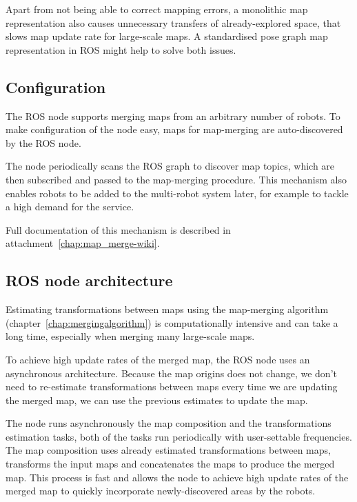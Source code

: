 Apart from not being able to correct mapping errors, a monolithic map representation also causes unnecessary transfers of already-explored space, that slows map update rate for large-scale maps. A standardised pose graph map representation in \gls{ROS} might help to solve both issues.


\subsection{Configuration}
\label{sec:configuration}

The \gls{ROS} node supports merging maps from an arbitrary number of robots. To make configuration of the node easy, maps for map-merging are auto-discovered by the \gls{ROS} node.

The node periodically scans the \gls{ROS} graph to discover map topics, which are then subscribed and passed to the map-merging procedure. This mechanism also enables robots to be added to the multi-robot system later, for example to tackle a high demand for the service.

Full documentation of this mechanism is described in attachment~\ref{chap:map_merge-wiki}.

\subsection{ROS node architecture}
\label{sec:node-architecture}

Estimating transformations between maps using the map-merging algorithm (chapter~\ref{chap:mergingalgorithm}) is computationally intensive and can take a long time, especially when merging many large-scale maps.

To achieve high update rates of the merged map, the \gls{ROS} node uses an asynchronous architecture. Because the map origins does not change, we don't need to re-estimate transformations between maps every time we are updating the merged map, we can use the previous estimates to update the map.

The node runs asynchronously the map composition and the transformations estimation tasks, both of the tasks run periodically with user-settable frequencies. The map composition uses already estimated transformations between maps, transforms the input maps and concatenates the maps to produce the merged map. This process is fast and allows the node to achieve high update rates of the merged map to quickly incorporate newly-discovered areas by the robots.

